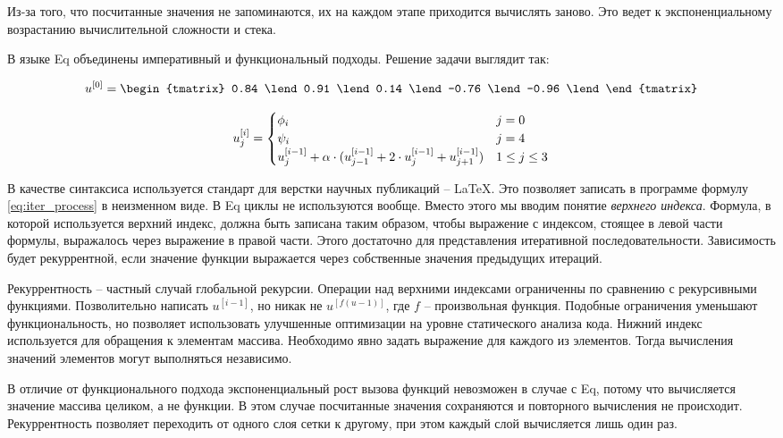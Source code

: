 \documentclass[a4paper]{llncs}
\begin{document}
Из-за того, что посчитанные значения не запоминаются, их на каждом этапе
приходится вычислять заново. Это ведет к экспоненциальному возрастанию
вычислительной сложности и стека.

В языке Eq объединены императивный и функциональный подходы. Решение задачи
выглядит так: \begin{figure}[ht]
  \centering
$$
  u^{[0]} =
  \begin{tmatrix}
    0.84 \lend
    0.91 \lend
    0.14 \lend
    -0.76 \lend
    -0.96 \lend
  \end{tmatrix} $$
\end{figure}
\begin{figure}[ht]
  \centering
$$  u^{[i]}_j = 
  \begin{cases}
    \phi_i & j = 0 \\ 
    \psi_i & j = 4 \\ 
  u^{[i-1]}_j + \alpha \cdot (u^{[i-1]}_{j-1} + 2 \cdot u^{[i-1]}_j +
  u^{[i-1]}_{j+1}) & 1 \leq j \leq 3 \\ 
  \end{cases}
$$
\end{figure}

В качестве синтаксиса используется стандарт для верстки научных публикаций --
\LaTeX. Это позволяет записать в программе формулу \eqref{eq:iter_process} в
неизменном виде. В Eq циклы не используются вообще. Вместо этого мы вводим
понятие \emph{верхнего индекса}. Формула, в которой используется верхний
индекс, должна быть записана таким образом, чтобы выражение с индексом, стоящее
в левой части формулы, выражалось через выражение в правой части. Этого
достаточно для представления итеративной последовательности. Зависимость будет
рекуррентной, если значение функции выражается через собственные значения
предыдущих итераций.

Рекуррентность -- частный случай глобальной рекурсии. Операции над верхними
индексами ограниченны по сравнению с рекурсивными функциями. Позволительно
написать $u^{[i-1]}$, но никак не $u^{[f(u-1)]}$, где $f$ -- произвольная
функция. Подобные ограничения уменьшают функциональность, но позволяет
использовать улучшенные оптимизации на уровне статического анализа кода.
Нижний индекс используется для обращения к элементам массива. Необходимо явно
задать выражение для каждого из элементов. Тогда вычисления значений элементов
могут выполняться независимо.

В отличие от функционального подхода экспоненциальный рост вызова функций
невозможен в случае с Eq, потому что вычисляется значение массива целиком, а не
функции. В этом случае посчитанные значения сохраняются и повторного вычисления
не происходит. Рекуррентность позволяет переходить от одного слоя сетки к
другому, при этом каждый слой вычисляется лишь один раз.
\end{document}
